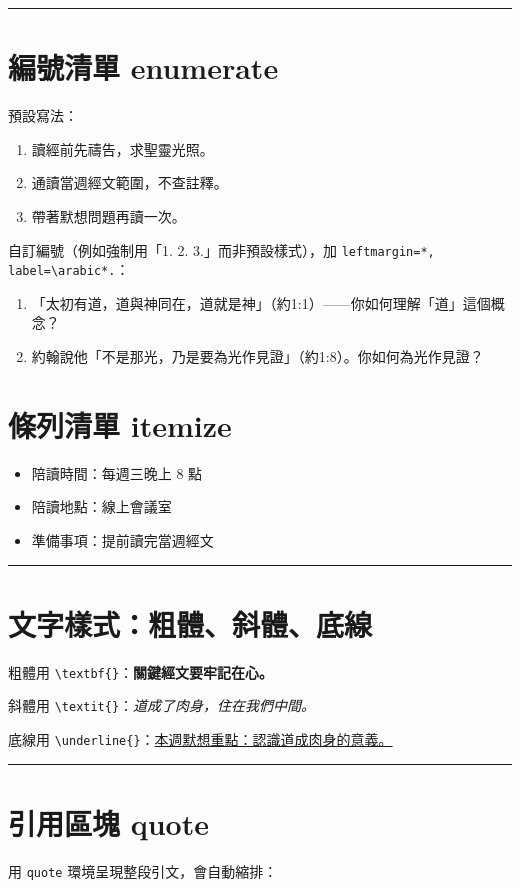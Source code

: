 \documentclass[12pt, a4paper]{article}
\begin{document}
\bigskip
\hrule
\bigskip

\section*{編號清單 enumerate}
預設寫法：

\begin{enumerate}
  \item 讀經前先禱告，求聖靈光照。
  \item 通讀當週經文範圍，不查註釋。
  \item 帶著默想問題再讀一次。
\end{enumerate}

自訂編號（例如強制用「1. 2. 3.」而非預設樣式），加 \verb|leftmargin=*, label=\arabic*.|：

\begin{enumerate}[leftmargin=*, label=\arabic*.]
  \item 「太初有道，道與神同在，道就是神」（約1:1）——你如何理解「道」這個概念？
  \item 約翰說他「不是那光，乃是要為光作見證」（約1:8）。你如何為光作見證？
\end{enumerate}

\section*{條列清單 itemize}
\begin{itemize}
  \item 陪讀時間：每週三晚上 8 點
  \item 陪讀地點：線上會議室
  \item 準備事項：提前讀完當週經文
\end{itemize}

\bigskip
\hrule
\bigskip

\section*{文字樣式：粗體、斜體、底線}
粗體用 \verb|\textbf{}|：\textbf{關鍵經文要牢記在心。}

斜體用 \verb|\textit{}|：\textit{道成了肉身，住在我們中間。}

底線用 \verb|\underline{}|：\underline{本週默想重點：認識道成肉身的意義。}

\bigskip
\hrule
\bigskip

\section*{引用區塊 quote}
用 \verb|quote| 環境呈現整段引文，會自動縮排：
\end{document}
